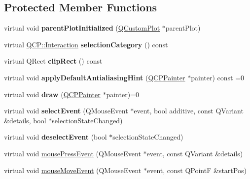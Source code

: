 \subsection*{Protected Member Functions}
\begin{DoxyCompactItemize}
\item 
\mbox{\label{classQCPLayerable_ab20b7dbd8e0249ed61adb9622c427382}} 
virtual void {\bfseries parent\+Plot\+Initialized} (\hyperlink{classQCustomPlot}{Q\+Custom\+Plot} $\ast$parent\+Plot)
\item 
\mbox{\label{classQCPLayerable_a908c9edda761886f33893be326dab77d}} 
virtual \hyperlink{namespaceQCP_a2ad6bb6281c7c2d593d4277b44c2b037}{Q\+C\+P\+::\+Interaction} {\bfseries selection\+Category} () const
\item 
\mbox{\label{classQCPLayerable_acbcfc9ecc75433747b1978a77b1864b3}} 
virtual Q\+Rect {\bfseries clip\+Rect} () const
\item 
\mbox{\label{classQCPLayerable_afdf83ddc6a265cbf4c89fe99d3d93473}} 
virtual void {\bfseries apply\+Default\+Antialiasing\+Hint} (\hyperlink{classQCPPainter}{Q\+C\+P\+Painter} $\ast$painter) const =0
\item 
\mbox{\label{classQCPLayerable_aecf2f7087482d4b6a78cb2770e5ed12d}} 
virtual void {\bfseries draw} (\hyperlink{classQCPPainter}{Q\+C\+P\+Painter} $\ast$painter)=0
\item 
\mbox{\label{classQCPLayerable_a7498c2d0d081cf7cad0fb3bb93aa0e91}} 
virtual void {\bfseries select\+Event} (Q\+Mouse\+Event $\ast$event, bool additive, const Q\+Variant \&details, bool $\ast$selection\+State\+Changed)
\item 
\mbox{\label{classQCPLayerable_ae546370644a5551c76af739afc008bee}} 
virtual void {\bfseries deselect\+Event} (bool $\ast$selection\+State\+Changed)
\item 
virtual void \hyperlink{classQCPLayerable_af6567604818db90f4fd52822f8bc8376}{mouse\+Press\+Event} (Q\+Mouse\+Event $\ast$event, const Q\+Variant \&details)
\item 
virtual void \hyperlink{classQCPLayerable_a9eee1ba47fd69be111059ca3881933e4}{mouse\+Move\+Event} (Q\+Mouse\+Event $\ast$event, const Q\+PointF \&start\+Pos)

\end{DoxyCompactItemize}
